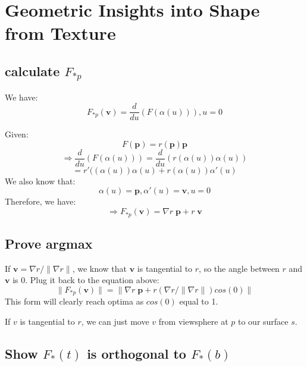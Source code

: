 \documentclass[twoside]{article}
\theoremstyle{definition}
\theoremstyle{definition}
\theoremstyle{remark}
\begin{document}
\section{Geometric Insights into Shape from Texture}
\subsection{calculate $F_{*p}$}
We have:
\[F_{*p} (\pmb{v}) = \frac{d}{du} (F(\alpha(u))), u=0\]

Given:
\[F(\pmb{p}) = r(\pmb{p}) \pmb{p}\]
\[\Rightarrow \frac{d}{du} (F(\alpha(u))) = \frac{d}{du} (r(\alpha(u)) \alpha(u))
\]
\[=r'((\alpha(u))\alpha(u)+r(\alpha(u))\alpha'(u)\]
We also know that:
\[\alpha(u) = \pmb{p}, \alpha'(u) = \pmb{v}, u = 0\]
Therefore, we have:
\[\Rightarrow F_{*p} (\pmb{v}) = \nabla r \;\pmb{ p} + r \;\pmb{v}\]

\subsection{Prove argmax}
If $\pmb{v} = \nabla r / \| \nabla r \|$, we know that $\pmb{v} $ is tangential to $r$, so the angle between $r$ and $\pmb{v} $ is 0. Plug it back to the equation above:
\[\| F_{*p} (\pmb{v}) \| =\| \nabla r \;\pmb{ p} + r ( \nabla r / \| \nabla r \|) cos(0) \|\]
This form will clearly reach optima as $cos(0)$ equal to 1. 

If $v$ is tangential to $r$, we can just move $v$ from viewsphere at $p$ to our surface $s$.  

\subsection{Show $F_*(t)$ is orthogonal to $F_*(b)$}
\end{document}
